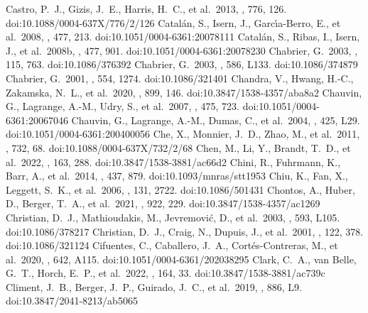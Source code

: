 \documentclass[twocolumn,tighten,twocolappendix]{aastex631}
\begin{document}
\begin{thebibliography}{}
 Castro, P.~J., Gizis, J.~E., Harris, H.~C., et al.\ 2013, \apj, 776, 126. doi:10.1088/0004-637X/776/2/126
 Catal{\'a}n, S., Isern, J., Garc{\'\i}a-Berro, E., et al.\ 2008, \aap, 477, 213. doi:10.1051/0004-6361:20078111
 Catal{\'a}n, S., Ribas, I., Isern, J., et al.\ 2008b, \aap, 477, 901. doi:10.1051/0004-6361:20078230
 Chabrier, G.\ 2003, \pasp, 115, 763. doi:10.1086/376392
 Chabrier, G.\ 2003, \apjl, 586, L133. doi:10.1086/374879
 Chabrier, G.\ 2001, \apj, 554, 1274. doi:10.1086/321401
 Chandra, V., Hwang, H.-C., Zakamska, N.~L., et al.\ 2020, \apj, 899, 146. doi:10.3847/1538-4357/aba8a2
 Chauvin, G., Lagrange, A.-M., Udry, S., et al.\ 2007, \aap, 475, 723. doi:10.1051/0004-6361:20067046
 Chauvin, G., Lagrange, A.-M., Dumas, C., et al.\ 2004, \aap, 425, L29. doi:10.1051/0004-6361:200400056
 Che, X., Monnier, J.~D., Zhao, M., et al.\ 2011, \apj, 732, 68. doi:10.1088/0004-637X/732/2/68
 Chen, M., Li, Y., Brandt, T.~D., et al.\ 2022, \aj, 163, 288. doi:10.3847/1538-3881/ac66d2
 Chini, R., Fuhrmann, K., Barr, A., et al.\ 2014, \mnras, 437, 879. doi:10.1093/mnras/stt1953
 Chiu, K., Fan, X., Leggett, S.~K., et al.\ 2006, \aj, 131, 2722. doi:10.1086/501431
 Chontos, A., Huber, D., Berger, T.~A., et al.\ 2021, \apj, 922, 229. doi:10.3847/1538-4357/ac1269
 Christian, D.~J., Mathioudakis, M., Jevremovi{\'c}, D., et al.\ 2003, \apjl, 593, L105. doi:10.1086/378217
 Christian, D.~J., Craig, N., Dupuis, J., et al.\ 2001, \aj, 122, 378. doi:10.1086/321124
 Cifuentes, C., Caballero, J.~A., Cort{\'e}s-Contreras, M., et al.\ 2020, \aap, 642, A115. doi:10.1051/0004-6361/202038295
 Clark, C.~A., van Belle, G.~T., Horch, E.~P., et al.\ 2022, \aj, 164, 33. doi:10.3847/1538-3881/ac739c
 Climent, J.~B., Berger, J.~P., Guirado, J.~C., et al.\ 2019, \apjl, 886, L9. doi:10.3847/2041-8213/ab5065

\end{thebibliography}
\end{document}
